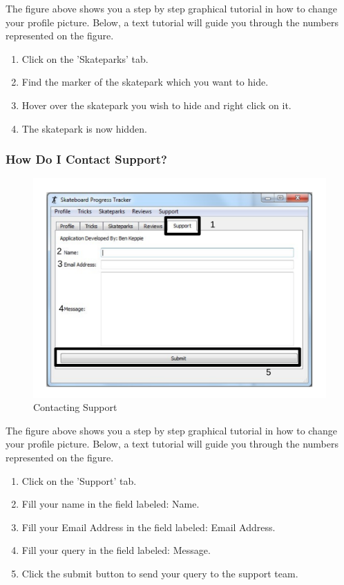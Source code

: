 The figure above shows you a step by step graphical tutorial in how to change your profile picture. Below, a text tutorial will guide you through the numbers represented on the figure.

\begin{enumerate}
\item Click on the 'Skateparks' tab.
\item Find the marker of the skatepark which you want to hide.
\item Hover over the skatepark you wish to hide and right click on it.
\item The skatepark is now hidden.
\end{enumerate}






\subsubsection{How Do I Contact Support?}

\begin{figure}[H]
    \includegraphics[width=\textwidth]{./Manual/Images/Support.pdf}
    \caption{Contacting Support} \label{fig:Support}
\end{figure}

The figure above shows you a step by step graphical tutorial in how to change your profile picture. Below, a text tutorial will guide you through the numbers represented on the figure.

\begin{enumerate}
\item Click on the 'Support' tab.
\item Fill your name in the field labeled: Name.
\item Fill your Email Address in the field labeled: Email Address.
\item Fill your query in the field labeled: Message.
\item Click the submit button to send your query to the support team.
\end{enumerate}


